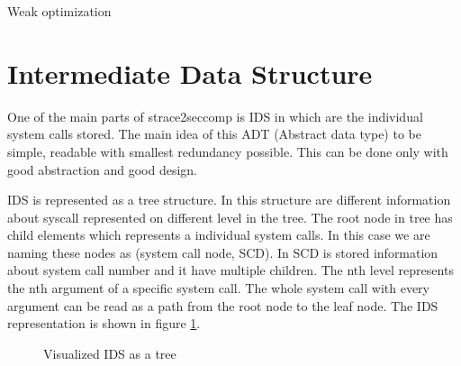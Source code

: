 \begin{algorithm}[h]



  \caption{Weak optimization}\label{algo:weak}
\end{algorithm}


\section{Intermediate Data Structure}
One of the main parts of strace2seccomp is IDS in which are the individual system calls stored.
The main idea of this ADT (Abstract data type) to be simple, readable with smallest redundancy possible.
This can be done only with good abstraction and good design.

IDS is represented as a tree structure.
In this structure are different information about syscall represented on different level in the tree.
The root node in tree has child elements which represents a individual system calls.
In this case we are naming these nodes as (system call node, SCD).
In SCD is stored information about system call number and it have multiple children.
The nth level represents the nth argument of a specific system call.
The whole system call with every argument can be read as a path from the root node to the leaf node.
The IDS representation is shown in figure \ref{fig:tikz:IDStree}.

\begin{figure}[h]
\centering
  \caption{Visualized IDS as a tree}
  \label{fig:tikz:IDStree}
\end{figure}

